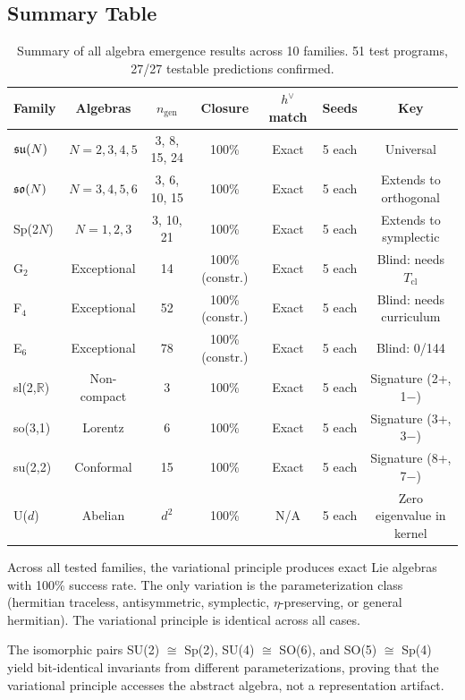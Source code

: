 \subsection{Summary Table}\label{sec:summary_table}

\begin{table}[t]
\centering
\begin{tabular}{lcccccc}
\hline\hline
\textbf{Family} & \textbf{Algebras} & \textbf{$n_{\mathrm{gen}}$} & \textbf{Closure} & \textbf{$h^\vee$ match} & \textbf{Seeds} & \textbf{Key} \\
\hline
$\mathfrak{su}(N)$ & $N = 2,3,4,5$ & 3, 8, 15, 24 & 100\% & Exact & 5 each & Universal \\
$\mathfrak{so}(N)$ & $N = 3,4,5,6$ & 3, 6, 10, 15 & 100\% & Exact & 5 each & Extends to orthogonal \\
Sp(2$N$) & $N = 1,2,3$ & 3, 10, 21 & 100\% & Exact & 5 each & Extends to symplectic \\
G$_2$ & Exceptional & 14 & 100\% (constr.) & Exact & 5 each & Blind: needs $T_{\mathrm{cl}}$ \\
F$_4$ & Exceptional & 52 & 100\% (constr.) & Exact & 5 each & Blind: needs curriculum \\
E$_6$ & Exceptional & 78 & 100\% (constr.) & Exact & 5 each & Blind: 0/144 \\
sl(2,$\mathbb{R}$) & Non-compact & 3 & 100\% & Exact & 5 each & Signature (2+, 1$-$) \\
so(3,1) & Lorentz & 6 & 100\% & Exact & 5 each & Signature (3+, 3$-$) \\
su(2,2) & Conformal & 15 & 100\% & Exact & 5 each & Signature (8+, 7$-$) \\
U($d$) & Abelian & $d^2$ & 100\% & N/A & 5 each & Zero eigenvalue in kernel \\
\hline\hline
\end{tabular}
\caption{Summary of all algebra emergence results across 10 families. 51 test programs, 27/27 testable predictions confirmed.}
\label{tab:summary_all}
\end{table}

Across all tested families, the variational principle produces exact Lie algebras with 100\% success rate. The only variation is the parameterization class (hermitian traceless, antisymmetric, symplectic, $\eta$-preserving, or general hermitian). The variational principle is identical across all cases.

The isomorphic pairs SU(2) $\cong$ Sp(2), SU(4) $\cong$ SO(6), and SO(5) $\cong$ Sp(4) yield bit-identical invariants from different parameterizations, proving that the variational principle accesses the abstract algebra, not a representation artifact.
